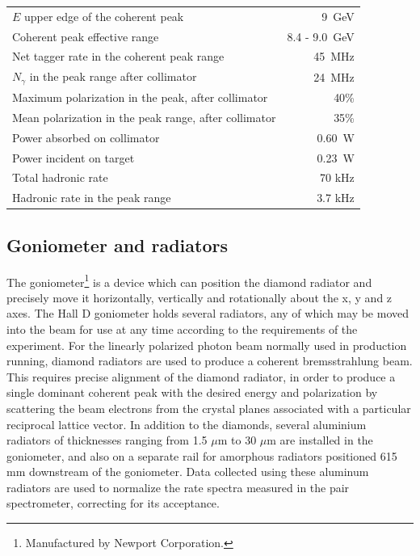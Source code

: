 \begin{table}[btp]
\begin{center}
\begin{tabular}{|l|r|}
\hline\hline
$E$ upper edge of the coherent peak & 9~GeV \\
Coherent peak effective range       & 8.4 - 9.0~GeV\\
Net tagger rate in the coherent peak range & 45~MHz  \\
$N_{\gamma}$ in the peak range after collimator & 24~MHz  \\
Maximum polarization in the peak, after collimator & 40\% \\
Mean polarization in the peak range, after collimator & 35\% \\
Power absorbed on collimator & 0.60~W \\
Power incident on target & 0.23~W \\
Total hadronic rate & 70 kHz \\
Hadronic rate in the peak range & 3.7 kHz \\
\hline\hline
\end{tabular}
\end{center}
\end{table}


\subsection{Goniometer and radiators \label{sec:radiators}}
The goniometer\footnote{Manufactured by Newport Corporation.} is a device which can position the
diamond radiator and precisely move it horizontally, vertically and rotationally about the x, y and z axes.
The Hall D goniometer holds several radiators, any of which may be moved into the beam for use at any time
according to the requirements of the experiment.
For the linearly polarized photon beam normally used in \GX{} production running, diamond radiators 
are used to produce a coherent bremsstrahlung beam. This requires precise alignment of the diamond
radiator, in order to produce a single dominant coherent peak with the desired energy and polarization
by scattering the beam electrons from the crystal planes associated with a particular reciprocal lattice
vector. In addition to the diamonds, several aluminium radiators of thicknesses ranging from 1.5 $\mu$m
to 30 $\mu$m are installed in the goniometer, and also on a separate rail for amorphous radiators
positioned 615 mm downstream of the goniometer. Data collected using these aluminum radiators are used
to normalize the rate spectra measured in the pair spectrometer, correcting for its acceptance.

